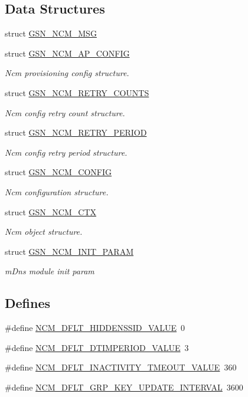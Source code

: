 \subsection*{Data Structures}
\begin{DoxyCompactItemize}
\item 
struct \hyperlink{a00160}{GSN\_\-NCM\_\-MSG}
\item 
struct \hyperlink{a00156}{GSN\_\-NCM\_\-AP\_\-CONFIG}
\begin{DoxyCompactList}\small\item\em Ncm provisioning config structure. \end{DoxyCompactList}\item 
struct \hyperlink{a00161}{GSN\_\-NCM\_\-RETRY\_\-COUNTS}
\begin{DoxyCompactList}\small\item\em Ncm config retry count structure. \end{DoxyCompactList}\item 
struct \hyperlink{a00162}{GSN\_\-NCM\_\-RETRY\_\-PERIOD}
\begin{DoxyCompactList}\small\item\em Ncm config retry period structure. \end{DoxyCompactList}\item 
struct \hyperlink{a00157}{GSN\_\-NCM\_\-CONFIG}
\begin{DoxyCompactList}\small\item\em Ncm configuration structure. \end{DoxyCompactList}\item 
struct \hyperlink{a00158}{GSN\_\-NCM\_\-CTX}
\begin{DoxyCompactList}\small\item\em Ncm object structure. \end{DoxyCompactList}\item 
struct \hyperlink{a00159}{GSN\_\-NCM\_\-INIT\_\-PARAM}
\begin{DoxyCompactList}\small\item\em mDns module init param \end{DoxyCompactList}\end{DoxyCompactItemize}
\subsection*{Defines}
\begin{DoxyCompactItemize}
\item 
\#define \hyperlink{a00529_a4d23ec736944f85655e86e558fd07a4d}{NCM\_\-DFLT\_\-HIDDENSSID\_\-VALUE}~0
\item 
\#define \hyperlink{a00529_a5fb27317dccb3b61dcc8bd59522c849f}{NCM\_\-DFLT\_\-DTIMPERIOD\_\-VALUE}~3
\item 
\#define \hyperlink{a00529_abb43ee4a73e404382808c773bee9f98b}{NCM\_\-DFLT\_\-INACTIVITY\_\-TMEOUT\_\-VALUE}~360
\item 
\#define \hyperlink{a00529_a6f9abd3777110673629c1ccc4f63ff05}{NCM\_\-DFLT\_\-GRP\_\-KEY\_\-UPDATE\_\-INTERVAL}~3600
\end{DoxyCompactItemize}
